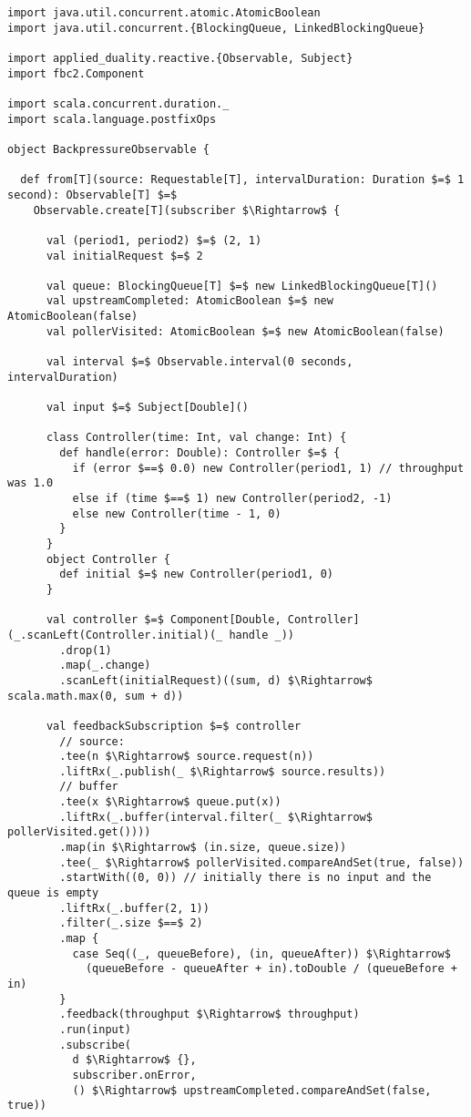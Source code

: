 \begin{lstlisting}[style=ScalaStyle, caption={Implementation of \code{BackpressureObservable}}]
import java.util.concurrent.atomic.AtomicBoolean
import java.util.concurrent.{BlockingQueue, LinkedBlockingQueue}

import applied_duality.reactive.{Observable, Subject}
import fbc2.Component

import scala.concurrent.duration._
import scala.language.postfixOps

object BackpressureObservable {

  def from[T](source: Requestable[T], intervalDuration: Duration $=$ 1 second): Observable[T] $=$
    Observable.create[T](subscriber $\Rightarrow$ {

      val (period1, period2) $=$ (2, 1)
      val initialRequest $=$ 2

      val queue: BlockingQueue[T] $=$ new LinkedBlockingQueue[T]()
      val upstreamCompleted: AtomicBoolean $=$ new AtomicBoolean(false)
      val pollerVisited: AtomicBoolean $=$ new AtomicBoolean(false)

      val interval $=$ Observable.interval(0 seconds, intervalDuration)

      val input $=$ Subject[Double]()

      class Controller(time: Int, val change: Int) {
        def handle(error: Double): Controller $=$ {
          if (error $==$ 0.0) new Controller(period1, 1) // throughput was 1.0
          else if (time $==$ 1) new Controller(period2, -1)
          else new Controller(time - 1, 0)
        }
      }
      object Controller {
        def initial $=$ new Controller(period1, 0)
      }

      val controller $=$ Component[Double, Controller](_.scanLeft(Controller.initial)(_ handle _))
        .drop(1)
        .map(_.change)
        .scanLeft(initialRequest)((sum, d) $\Rightarrow$ scala.math.max(0, sum + d))

      val feedbackSubscription $=$ controller
        // source:
        .tee(n $\Rightarrow$ source.request(n))
        .liftRx(_.publish(_ $\Rightarrow$ source.results))
        // buffer
        .tee(x $\Rightarrow$ queue.put(x))
        .liftRx(_.buffer(interval.filter(_ $\Rightarrow$ pollerVisited.get())))
        .map(in $\Rightarrow$ (in.size, queue.size))
        .tee(_ $\Rightarrow$ pollerVisited.compareAndSet(true, false))
        .startWith((0, 0)) // initially there is no input and the queue is empty
        .liftRx(_.buffer(2, 1))
        .filter(_.size $==$ 2)
        .map {
          case Seq((_, queueBefore), (in, queueAfter)) $\Rightarrow$
            (queueBefore - queueAfter + in).toDouble / (queueBefore + in)
        }
        .feedback(throughput $\Rightarrow$ throughput)
        .run(input)
        .subscribe(
          d $\Rightarrow$ {},
          subscriber.onError,
          () $\Rightarrow$ upstreamCompleted.compareAndSet(false, true))


\end{lstlisting}

